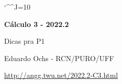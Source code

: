 \documentclass[oneside,12pt]{article}
\begin{document}
\catcode`\^^J=10
\pu
\def\pictgridstyle{\color{GrayPale}\linethickness{0.3pt}}
\def\pictaxesstyle{\linethickness{0.5pt}}
\def\pictnaxesstyle{\color{GrayPale}\linethickness{0.5pt}}
\celllower=2.5pt


\def\u#1{\par{\footnotesize \url{#1}}}

\def\drafturl{http://angg.twu.net/LATEX/2022-2-C3.pdf}
\def\drafturl{http://angg.twu.net/2022.2-C3.html}
\def\draftfooter{\tiny \href{\drafturl}{\jobname{}} \ColorBrown{\shorttoday{} \hours}}



%

\thispagestyle{empty}

\begin{center}

\vspace*{1.2cm}

{\bf \Large Cálculo 3 - 2022.2}

\bsk

Dicas pra P1

\bsk

Eduardo Ochs - RCN/PURO/UFF

\url{http://angg.twu.net/2022.2-C3.html}

\end{center}

\newpage


\newpage
\end{document}
